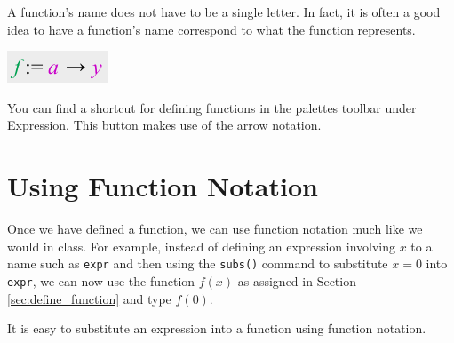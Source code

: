A function's name does not have to be a single letter. In fact, it is often a good idea to have a function's name correspond to what the function represents.

\begin{maplegroup}
\begin{mapleinput}
\end{mapleinput}
\mapleresult
\begin{maplelatex}
\end{maplelatex}
\end{maplegroup}

\begin{marginfigure}
\centering
\includegraphics[scale=0.8]{tutorials/figures/palettefunc.png}
\caption{You can find a shortcut for defining functions in the palettes toolbar under Expression. This button makes use of the arrow notation.}
\end{marginfigure}

\section{Using Function Notation}
\label{sec:function_notation}

Once we have defined a function, we can use function notation much like we would in class. For example, instead of defining an expression involving $x$ to a name such as \texttt{expr} and then using the \texttt{subs()} command to substitute $x=0$ into \texttt{expr}, we can now use the function $f(x)$ as assigned in Section \ref{sec:define_function} and type $f(0)$.

\begin{maplegroup}
\begin{mapleinput}
\end{mapleinput}
\mapleresult
\begin{maplelatex}
\end{maplelatex}
\end{maplegroup}

It is easy to substitute an expression into a function using function notation.

